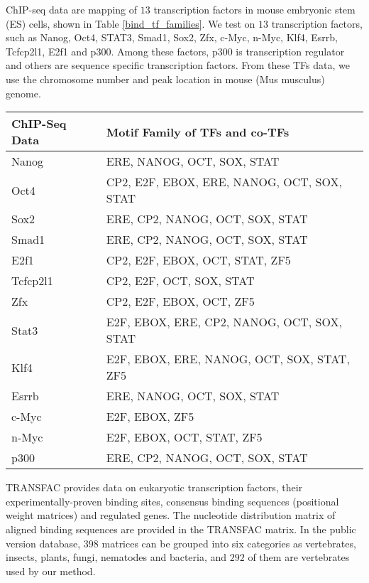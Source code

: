 \documentclass[journal,transmag]{IEEEtran}
\begin{document}
ChIP-seq data \cite{mybibfile:mms10} are mapping of $13$
transcription factors in mouse embryonic stem (ES) cells, shown in
Table \ref{bind_tf_families}. We test on $13$ transcription factors,
such as Nanog, Oct4, STAT3, Smad1, Sox2, Zfx, c-Myc, n-Myc, Klf4,
Esrrb, Tcfcp2l1, E2f1 and p300. Among these factors, p300 is
transcription regulator and others are sequence specific
transcription factors. From these TFs data, we use the chromosome
number and peak location in mouse (Mus musculus) genome.

\begin{table*}[!htpb]
\centering
\begin{threeparttable}
\renewcommand{\arraystretch}{1.3}
\caption{Motif family of TFs and co-TFs for ChIP-seq data.}
\label{bind_tf_families}
\begin{tabular}{|l|l|}
\hline
\textbf{ChIP-Seq Data} & \textbf{Motif Family of TFs and co-TFs} \\ \hline
Nanog    & ERE, NANOG, OCT, SOX, STAT \\ \hline
Oct4     & CP2, E2F, EBOX, ERE, NANOG, OCT, SOX, STAT \\ \hline
Sox2     & ERE, CP2, NANOG, OCT, SOX, STAT \\ \hline
Smad1    & ERE, CP2, NANOG, OCT, SOX, STAT \\ \hline
E2f1     & CP2, E2F, EBOX, OCT, STAT, ZF5 \\ \hline
Tcfcp2l1 & CP2, E2F, OCT, SOX, STAT \\ \hline
Zfx      & CP2, E2F, EBOX, OCT, ZF5 \\ \hline
Stat3    & E2F, EBOX, ERE, CP2, NANOG, OCT, SOX, STAT \\ \hline
Klf4     & E2F, EBOX, ERE, NANOG, OCT, SOX, STAT, ZF5 \\ \hline
Esrrb    & ERE, NANOG, OCT, SOX, STAT \\ \hline
c-Myc    & E2F, EBOX, ZF5 \\ \hline
n-Myc    & E2F, EBOX, OCT, STAT, ZF5 \\ \hline
p300     & ERE, CP2, NANOG, OCT, SOX, STAT \\ \hline
\end{tabular}
\end{threeparttable}
\end{table*}


TRANSFAC \cite{mybibfile:transfac} provides data on eukaryotic
transcription factors, their experimentally-proven binding sites,
consensus binding sequences (positional weight matrices) and
regulated genes. The nucleotide distribution matrix of aligned
binding sequences are provided in the TRANSFAC matrix. In the public
version database, $398$ matrices can be grouped into six categories
as vertebrates, insects, plants, fungi, nematodes and bacteria, and
$292$ of them are vertebrates used by our method.
\end{document}
